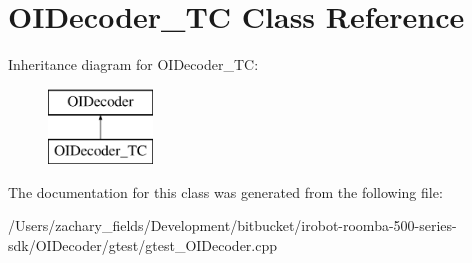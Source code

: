 \hypertarget{class_o_i_decoder___t_c}{\section{O\+I\+Decoder\+\_\+\+T\+C Class Reference}
\label{class_o_i_decoder___t_c}
}
Inheritance diagram for O\+I\+Decoder\+\_\+\+T\+C\+:\begin{figure}[H]
\begin{center}
\leavevmode
\includegraphics[height=2.000000cm]{class_o_i_decoder___t_c}
\end{center}
\end{figure}


The documentation for this class was generated from the following file\+:\begin{DoxyCompactItemize}
\item 
/\+Users/zachary\+\_\+fields/\+Development/bitbucket/irobot-\/roomba-\/500-\/series-\/sdk/\+O\+I\+Decoder/gtest/gtest\+\_\+\+O\+I\+Decoder.\+cpp\end{DoxyCompactItemize}
